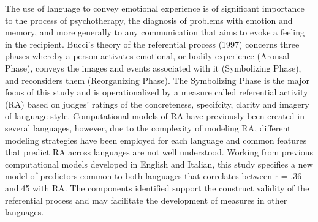 The use of language to convey emotional experience is of significant importance to the process of psychotherapy, the diagnosis of problems with emotion and memory, and more generally to any communication that aims to evoke a feeling in the recipient.              Bucci's theory of the referential process (1997) concerns three phases whereby a person activates emotional, or bodily experience (Arousal Phase), conveys the images and events associated with it (Symbolizing Phase), and reconsiders them (Reorganizing Phase). The Symbolizing Phase is the major focus of this study and is operationalized by a measure called referential activity (RA) based on judges' ratings of the concreteness, specifcity, clarity and imagery of language style.              Computational models of RA have previously been created in several languages, however, due to the complexity of modeling RA, different modeling strategies have been employed for each language and common features that predict RA across languages are not well understood.  Working from previous computational models developed in English and Italian, this study specifies a new model of predictors common to both languages that correlates between r = .36 and.45 with RA.  The components identified support the construct validity of the referential process and may facilitate the development of measures in other languages.
